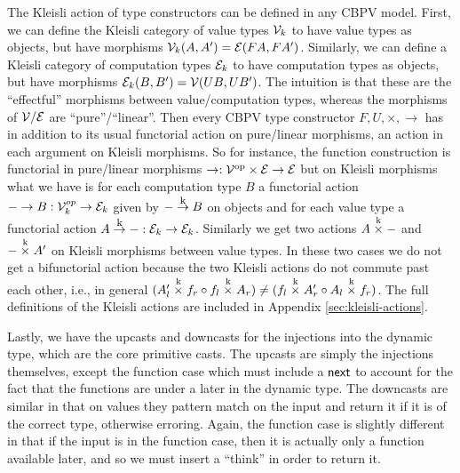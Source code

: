 The Kleisli action of type constructors can be defined in any CBPV
model. First, we can define the Kleisli category of value types
$\mathcal{V}_k$ to have value types as objects, but have morphisms
$\mathcal{V}_k(A,A') = \mathcal{E}(FA,FA')$. Similarly, we can define a Kleisli
category of computation types $\mathcal{E}_k$ to have computation types as
objects, but have morphisms $\mathcal{E}_k(B,B') = \mathcal{V}(UB,UB')$. The
intuition is that these are the ``effectful'' morphisms between
value/computation types, whereas the morphisms of $\mathcal{V}/\mathcal{E}$ are
``pure''/``linear''. Then every CBPV type constructor $F,U,\times,\to$
has in addition to its usual functorial action on pure/linear
morphisms, an action in each argument on Kleisli morphisms. So for
instance, the function construction is functorial in pure/linear
morphisms $\to : {\mathcal{V}}^{\textrm{op}} \times \mathcal{E} \to \mathcal{E}$ but on Kleisli
morphisms what we have is for each computation type $B$ a functorial
action $-\to B : \mathcal{V}_k^{op} \to \mathcal{E}_k$ given by $-\mathrel{\mathop{\to}\limits^{\textrm{\footnotesize k}}} B$ on
objects and for each value type a functorial action $A \mathrel{\mathop{\to}\limits^{\textrm{\footnotesize k}}} - :
\mathcal{E}_k \to \mathcal{E}_k$. Similarly we get two actions $A \mathrel{\mathop{\times}\limits^{\textrm{k}}} -$ and
$-\mathrel{\mathop{\times}\limits^{\textrm{k}}} A'$ on Kleisli morphisms between value types. In these two
cases we do not get a bifunctorial action because the two Kleisli
actions do not commute past each other, i.e., in general $(A_l'
\mathrel{\mathop{\times}\limits^{\textrm{k}}} f_r \circ f_l \mathrel{\mathop{\times}\limits^{\textrm{k}}} A_r) \neq (f_l \mathrel{\mathop{\times}\limits^{\textrm{k}}} A_r' \circ A_l
\mathrel{\mathop{\times}\limits^{\textrm{k}}} f_r)$. The full definitions of the Kleisli actions are
included in Appendix \ref{sec:kleisli-actions}.

Lastly, we have the upcasts and downcasts for the injections into the dynamic type, which
are the core primitive casts. The upcasts are simply the injections
themselves, except the function case which must include a $\mathsf{next}$ to
account for the fact that the functions are under a later in the
dynamic type. The downcasts are similar in that on values
they pattern match on the input and return it if it is of the correct
type, otherwise erroring. Again, the function case is slightly
different in that if the input is in the function case, then it is
actually only a function available later, and so we must insert a
``think'' in order to return it.



